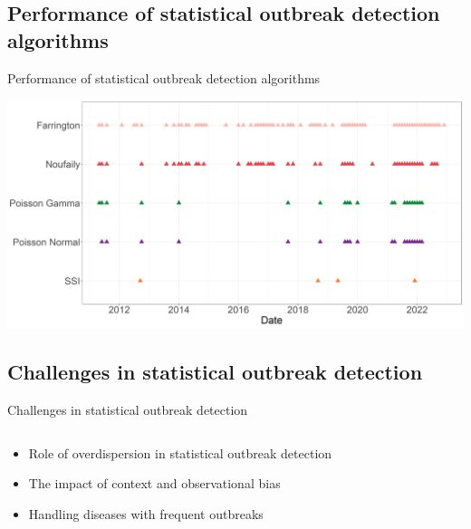 \documentclass[aspectratio=169,handout]{beamer}
\begin{document}
\hypertarget{performance-of-statistical-outbreak-detection-algorithms}{%
\subsection{Performance of statistical outbreak detection
algorithms}\label{performance-of-statistical-outbreak-detection-algorithms}}

\begin{frame}{Performance of statistical outbreak detection algorithms}
\tiny

\includegraphics[width=1\linewidth]{../../figures/Compare_alarms_STEC}

\normalsize
\end{frame}

\hypertarget{challenges-in-statistical-outbreak-detection}{%
\subsection{Challenges in statistical outbreak
detection}\label{challenges-in-statistical-outbreak-detection}}

\begin{frame}{Challenges in statistical outbreak detection}
\begin{columns}
\begin{column}{.50\textwidth}
\begin{itemize}
  \item<1> Role of overdispersion in statistical outbreak detection
  \item<2> The impact of context and observational bias
  \item<3> Handling diseases with frequent outbreaks
\end{itemize}
\end{column}
\hfill
\begin{column}{.46\textwidth}

\end{column}
\end{columns}
\end{frame}
\end{document}

